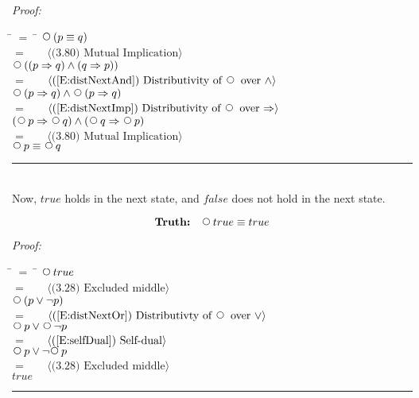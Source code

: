 \documentclass[fleqn, leqno]{article}
\newcommand{\lgap}{2pt} %
\newcommand{\mymathindent}{24pt} %
\newcommand{\Next}{\;\,\text{\raisebox{3.5pt}{\circle{6}}}}
\newcommand{\myqed}{\hfill\rule[-.23ex]{1.2ex}{2.0ex}}
\newcommand{\Gll} {\langle} %
\newcommand{\Ggg} {\rangle} %
\newcommand{\Hint}[1] {\ \ \ $\Gll \mbox{#1} \Ggg$ } %
\begin{document}
\emph{Proof:}
\begin{tabbing}
\hspace{\mymathindent} \= $= \;$ \= \kill
\> \> $\Next (p \equiv q)$\\[\lgap]
\> $=$ \> \Hint{(3.80) Mutual Implication}\\[\lgap]
\> \> $\Next ((p \Rightarrow q) \land (q \Rightarrow p))$\\[\lgap]
\> $=$ \> \Hint{(\ref{E:distNextAnd}) Distributivity of $\Next$ over $\land$}\\[\lgap]
\> \> $\Next (p \Rightarrow q) \land \Next (p \Rightarrow q)$\\[\lgap]
\> $=$ \> \Hint{(\ref{E:distNextImp}) Distributivity of $\Next$ over $\Rightarrow$}\\[\lgap]
\> \> $(\Next p \Rightarrow \Next q) \land (\Next q \Rightarrow \Next p)$\\[\lgap]
\> $=$ \> \Hint{(3.80) Mutual Implication}\\[\lgap]
\> \> $\Next p \equiv \Next q$
\end{tabbing}
\myqed\\[\lgap]

Now, $true$ holds in the next state, and $false$ does not hold in the next state.

\begin{equation}\label{E:nextTruth}
\textbf{Truth:}\quad \Next true \equiv true
\end{equation}

\emph{Proof:}
\begin{tabbing}
\hspace{\mymathindent} \= $= \;$ \= \kill
\> \> $\Next true$\\[\lgap]
\> $=$ \> \Hint{(3.28) Excluded middle}\\[\lgap]
\> \> $\Next(p \lor \lnot p)$\\[\lgap]
\> $=$ \> \Hint{(\ref{E:distNextOr}) Distributivty of $\Next$ over $\lor$}\\[\lgap]
\> \> $\Next p \lor \Next\lnot p$\\[\lgap]
\> $=$ \> \Hint{(\ref{E:selfDual}) Self-dual}\\[\lgap]
\> \> $\Next p \lor \lnot\Next p$\\[\lgap]
\> $=$ \> \Hint{(3.28) Excluded middle}\\[\lgap]
\> \> $true$\\[\lgap]
\end{tabbing}
\myqed\\[\lgap]
\end{document}
